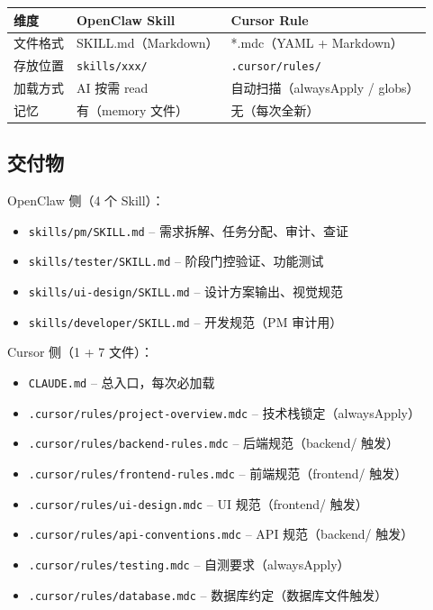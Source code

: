 \documentclass[11pt,a4paper]{article}
\begin{document}
\begin{table}[h]
\centering
\begin{tabular}{p{2.5cm}p{4.5cm}p{4.5cm}}
\toprule
\textbf{维度} & \textbf{OpenClaw Skill} & \textbf{Cursor Rule} \\
\midrule
文件格式 & SKILL.md（Markdown） & *.mdc（YAML + Markdown） \\
存放位置 & \texttt{skills/xxx/} & \texttt{.cursor/rules/} \\
加载方式 & AI 按需 read & 自动扫描（alwaysApply / globs） \\
记忆 & 有（memory 文件） & 无（每次全新） \\
\bottomrule
\end{tabular}
\end{table}

\subsection{交付物}

OpenClaw 侧（4 个 Skill）：
\begin{itemize}[nosep]
  \item \texttt{skills/pm/SKILL.md} -- 需求拆解、任务分配、审计、查证
  \item \texttt{skills/tester/SKILL.md} -- 阶段门控验证、功能测试
  \item \texttt{skills/ui-design/SKILL.md} -- 设计方案输出、视觉规范
  \item \texttt{skills/developer/SKILL.md} -- 开发规范（PM 审计用）
\end{itemize}

Cursor 侧（1 + 7 文件）：
\begin{itemize}[nosep]
  \item \texttt{CLAUDE.md} -- 总入口，每次必加载
  \item \texttt{.cursor/rules/project-overview.mdc} -- 技术栈锁定（alwaysApply）
  \item \texttt{.cursor/rules/backend-rules.mdc} -- 后端规范（backend/ 触发）
  \item \texttt{.cursor/rules/frontend-rules.mdc} -- 前端规范（frontend/ 触发）
  \item \texttt{.cursor/rules/ui-design.mdc} -- UI 规范（frontend/ 触发）
  \item \texttt{.cursor/rules/api-conventions.mdc} -- API 规范（backend/ 触发）
  \item \texttt{.cursor/rules/testing.mdc} -- 自测要求（alwaysApply）
  \item \texttt{.cursor/rules/database.mdc} -- 数据库约定（数据库文件触发）
\end{itemize}
\end{document}
